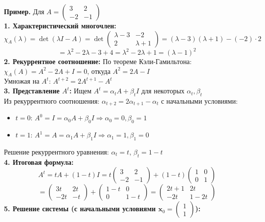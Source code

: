 \textbf{Пример.} Для $A = \begin{pmatrix} 3 & 2 \\ -2 & -1 \end{pmatrix}$\\
\textbf{1. Характеристический многочлен:}
$$\chi_A(\lambda) = \det(\lambda I - A) = \det\begin{pmatrix} \lambda-3 & -2 \\ 2 & \lambda+1 \end{pmatrix} = (\lambda-3)(\lambda+1) - (-2) \cdot 2$$
$$= \lambda^2 - 2\lambda - 3 + 4 = \lambda^2 - 2\lambda + 1 = (\lambda-1)^2$$
\textbf{2. Рекуррентное соотношение:}
По теореме Кэли-Гамильтона: $\chi_A(A) = A^2 - 2A + I = 0$, откуда $A^2 = 2A - I$\\
Умножая на $A^t$: $A^{t+2} = 2A^{t+1} - A^t$\\
\textbf{3. Представление $A^t$:}
Ищем $A^t = \alpha_t A + \beta_t I$ для некоторых $\alpha_t, \beta_t$\\
Из рекуррентного соотношения: $\alpha_{t+2} = 2\alpha_{t+1} - \alpha_t$ с начальными условиями:
\begin{itemize}
\item $t=0$: $A^0 = I = \alpha_0 A + \beta_0 I \Rightarrow \alpha_0 = 0, \beta_0 = 1$
\item $t=1$: $A^1 = A = \alpha_1 A + \beta_1 I \Rightarrow \alpha_1 = 1, \beta_1 = 0$
\end{itemize}
Решение рекуррентного уравнения: $\alpha_t = t$, $\beta_t = 1-t$\\
\textbf{4. Итоговая формула:}
$$A^t = tA + (1-t)I = t\begin{pmatrix} 3 & 2 \\ -2 & -1 \end{pmatrix} + (1-t)\begin{pmatrix} 1 & 0 \\ 0 & 1 \end{pmatrix}$$
$$= \begin{pmatrix} 3t & 2t \\ -2t & -t \end{pmatrix} + \begin{pmatrix} 1-t & 0 \\ 0 & 1-t \end{pmatrix} = \begin{pmatrix} 2t+1 & 2t \\ -2t & 1-2t \end{pmatrix}$$
\textbf{5. Решение системы (с начальными условиями $\mathbf{x}_0 = \begin{pmatrix} 1 \\ 1 \end{pmatrix}$):}
